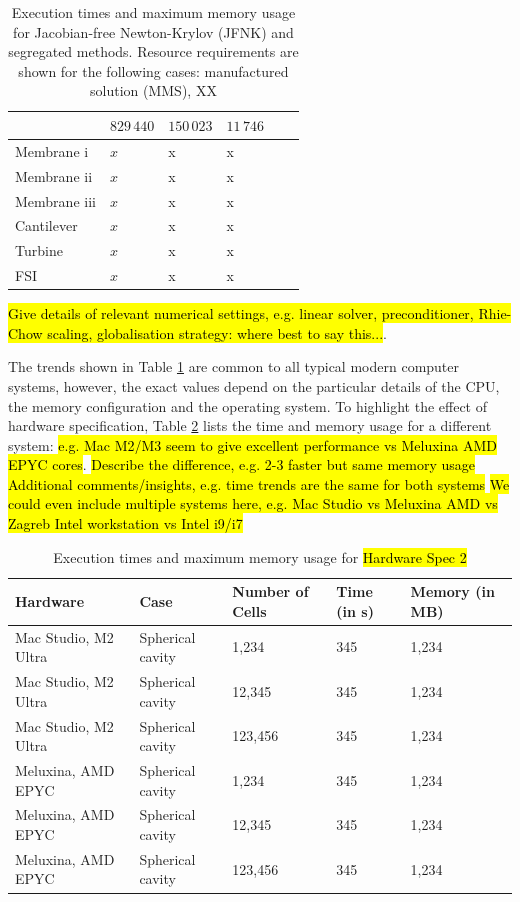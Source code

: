 \documentclass[sn-mathphys,Numbered]{sn-jnl}%
\begin{document}
\begin{table}[htb]
\begin{tabular}{ll|ll|ll}
				& $829\,440$ & $150\,023$ & $11\,746$ & & \\
			\hline
			Membrane i & $x$ & x & x & & \\
			\hline
			Membrane ii & $x$ & x & x & & \\
			\hline
			Membrane iii & $x$ & x & x & & \\
			\hline
			Cantilever & $x$ & x & x & & \\
			\hline
			Turbine & $x$ & x & x & & \\
			\hline
			FSI & $x$ & x & x & & \\
			\hline
		\end{tabular}
	\caption{Execution times and maximum memory usage for Jacobian-free Newton-Krylov (JFNK) and segregated methods. Resource requirements are shown for the following cases: manufactured solution (MMS), XX }
	\label{tab:times_memory}
\end{table}


\hl{Give details of relevant numerical settings, e.g. linear solver, preconditioner, Rhie-Chow scaling, globalisation strategy: where best to say this...}.

The trends shown in Table \ref{tab:times_memory} are common to all typical modern computer systems, however, the exact values depend on the particular details of the CPU, the memory configuration and the operating system.
To highlight the effect of hardware specification, Table \ref{tab:times_memory_spec2} lists the time and memory usage for a different system: \hl{e.g. Mac M2/M3 seem to give excellent performance vs Meluxina AMD EPYC cores}.
\hl{Describe the difference, e.g. 2-3 faster but same memory usage}
\hl{Additional comments/insights, e.g. time trends are the same for both systems}
\hl{We could even include multiple systems here, e.g. Mac Studio vs Meluxina AMD vs Zagreb Intel workstation vs Intel i9/i7}
\begin{table}[htb]
	\centering
		\begin{tabular}{lllll}
			\hline
			Hardware & Case & Number of Cells & Time (in s) & Memory (in MB) \\
			\hline 
			Mac Studio, M2 Ultra & Spherical cavity & 1,234 & 345 & 1,234  \\
			Mac Studio, M2 Ultra & Spherical cavity & 12,345 & 345 & 1,234  \\
			Mac Studio, M2 Ultra & Spherical cavity & 123,456 & 345 & 1,234  \\
			Meluxina, AMD EPYC & Spherical cavity & 1,234 & 345 & 1,234  \\
			Meluxina, AMD EPYC & Spherical cavity & 12,345 & 345 & 1,234  \\
			Meluxina, AMD EPYC & Spherical cavity & 123,456 & 345 & 1,234  \\
			\hline
		\end{tabular}
	\caption{Execution times and maximum memory usage for \hl{Hardware Spec 2}}
	\label{tab:times_memory_spec2}
\end{table}
\end{document}
